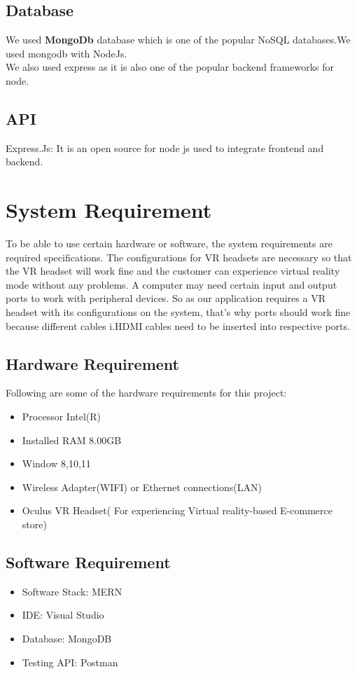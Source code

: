 \subsection{Database}
We used  \textbf{MongoDb} database which is one of the popular NoSQL databases.We used mongodb with NodeJs.\\ We also used express as it is also one of the popular backend frameworks for node.
\subsection{API}
Express.Js: It is an open source for node js used to integrate frontend
and backend.

\section{System Requirement}

To be able to use certain hardware or software, the system requirements are required specifications. The configurations for VR headsets are necessary so that the VR headset will work fine and the customer can experience virtual reality mode without any problems. A computer may need certain input and output ports to work with peripheral devices. So as our application requires a VR headset with its configurations on the system, that's why ports should work fine because different cables i.HDMI cables need to be inserted into respective ports.
\subsection{Hardware Requirement}
Following are some of the hardware requirements for this project:
\begin{itemize}
   \item Processor Intel(R)  
    \item Installed RAM 8.00GB
    \item Window 8,10,11
    \item Wireless Adapter(WIFI) or Ethernet connections(LAN)
    \item Oculus VR Headset( For experiencing Virtual reality-based E-commerce store)
\end{itemize}
 
\subsection{Software Requirement}
\begin{itemize}
    \item Software Stack: MERN 
    \item IDE: Visual Studio
    \item Database: MongoDB
    \item Testing API: Postman
\end{itemize}
